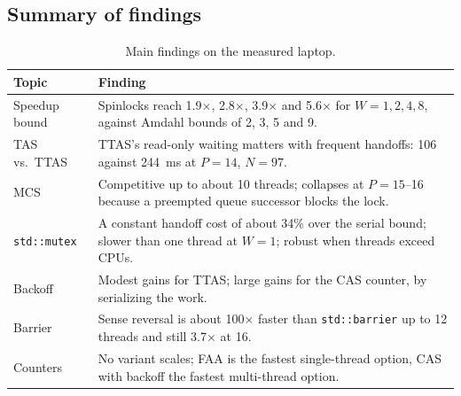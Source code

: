 \subsection{Summary of findings}

\begin{table}[H]
\centering
\small
\caption{Main findings on the measured laptop.}\label{tab:findings}
\begin{tabular}{|>{\raggedright\arraybackslash}p{}|>{\raggedright\arraybackslash}p{}|}
\hline
\textbf{Topic} & \textbf{Finding} \\ \hline
Speedup bound & Spinlocks reach 1.9$\times$, 2.8$\times$, 3.9$\times$ and 5.6$\times$ for $W=1,2,4,8$, against Amdahl bounds of 2, 3, 5 and 9. \\ \hline
TAS vs.\ TTAS & TTAS's read-only waiting matters with frequent handoffs: 106 against 244~ms at $P=14$, $N=97$. \\ \hline
MCS & Competitive up to about 10 threads; collapses at $P=15$--16 because a preempted queue successor blocks the lock. \\ \hline
\texttt{std::mutex} & A constant handoff cost of about 34\% over the serial bound; slower than one thread at $W=1$; robust when threads exceed CPUs. \\ \hline
Backoff & Modest gains for TTAS; large gains for the CAS counter, by serializing the work. \\ \hline
Barrier & Sense reversal is about 100$\times$ faster than \texttt{std::barrier} up to 12 threads and still 3.7$\times$ at 16. \\ \hline
Counters & No variant scales; FAA is the fastest single-thread option, CAS with backoff the fastest multi-thread option. \\ \hline
\end{tabular}
\end{table}
